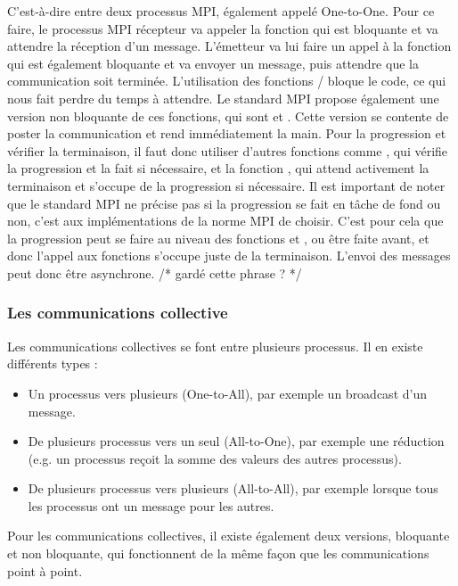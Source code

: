 C'est-à-dire entre deux processus MPI, également appelé One-to-One.
Pour ce faire, le processus MPI récepteur va appeler la fonction  qui est bloquante et va attendre la réception d'un message.
L'émetteur va lui faire un appel à la fonction  qui est également bloquante et va envoyer un message, puis attendre que la communication soit terminée.
L'utilisation des fonctions  /  bloque le code, ce qui nous fait perdre du temps à attendre.
Le standard MPI propose également une version non bloquante de ces fonctions, qui sont  et .
Cette version se contente de poster la communication et rend immédiatement la main.
Pour la progression et vérifier la terminaison, il faut donc utiliser d'autres fonctions comme , qui vérifie la progression et la fait si nécessaire, et la fonction , qui attend activement la terminaison et s'occupe de la progression si nécessaire.
Il est important de noter que le standard MPI ne précise pas si la progression se fait en tâche de fond ou non, c'est aux implémentations de la norme MPI de choisir.
C'est pour cela que la progression peut se faire au niveau des fonctions  et , ou être faite avant, et donc l'appel aux fonctions s'occupe juste de la terminaison.
L'envoi des messages peut donc être asynchrone. /* gardé cette phrase ? */

\subsubsection{Les communications collective}

Les communications collectives se font entre plusieurs processus.
Il en existe différents types :
\begin{itemize}
  \item Un processus vers plusieurs (One-to-All), par exemple un broadcast d'un message.
  \item De plusieurs processus vers un seul (All-to-One), par exemple une réduction (e.g. un processus reçoit la somme des valeurs des autres processus).
  \item De plusieurs processus vers plusieurs (All-to-All), par exemple lorsque tous les processus ont un message pour les autres.
\end{itemize}
Pour les communications collectives, il existe également deux versions, bloquante et non bloquante, qui fonctionnent de la même façon que les communications point à point.

